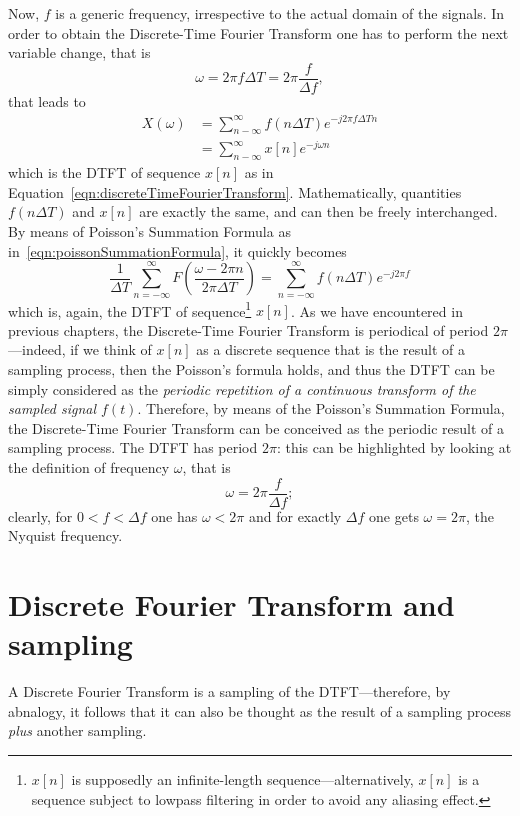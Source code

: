 \documentclass[\documentfontsize, twocolumn]{\classname}
\begin{document}
Now, $f$ is a generic frequency, irrespective to the actual domain of the signals. In order to obtain the Discrete-Time Fourier Transform one has to perform the next variable change, that is
\[
    \omega = 2\pi f \Delta T = 2 \pi \frac {f}{\Delta f},
\]
that leads to
\begin{align*}
    X(\omega) &= \sum_{n-\infty}^\infty f(n\Delta T) e^{-j2\pi f\Delta T n} \\
              &= \sum_{n-\infty}^\infty x[n] e^{-j\omega n}
\end{align*}
which is the DTFT of sequence $x[n]$ as in Equation~\ref{eqn:discreteTimeFourierTransform}. Mathematically, quantities $f(n\Delta T)$ and $x[n]$ are exactly the same, and can then be freely interchanged. By means of Poisson's Summation Formula as in~\ref{eqn:poissonSummationFormula}, it quickly becomes
\[
    \frac{1}{\Delta T} \sum_{n=-\infty}^\infty F\left(\frac {\omega - 2\pi n}{2\pi\Delta T}\right) = \sum_{n=-\infty}^\infty f(n\Delta T) e^{-j2\pi f}
\]
which is, again, the DTFT of sequence\footnote{$x[n]$ is supposedly an infinite-length sequence---alternatively, $x[n]$ is a sequence subject to lowpass filtering in order to avoid any aliasing effect.} $x[n]$. As we have encountered in previous chapters, the Discrete-Time Fourier Transform is periodical of period $2\pi$---indeed, if we think of $x[n]$ as a discrete sequence that is the result of a sampling process, then the Poisson's formula holds, and thus the DTFT can be simply considered as the \emph{periodic repetition of a continuous transform of the sampled signal $f(t)$}. Therefore, by means of the Poisson's Summation Formula, the Discrete-Time Fourier Transform can be conceived as the periodic result of a sampling process. The DTFT has period $2\pi$: this can be highlighted by looking at the definition of frequency $\omega$, that is
\[
    \omega = 2\pi \frac {f} {\Delta f};
\]
clearly, for $0 < f < \Delta f$ one has $\omega < 2\pi$ and for exactly $\Delta f$ one gets $\omega = 2\pi$, the Nyquist frequency.

\section{Discrete Fourier Transform and sampling}

A Discrete Fourier Transform is a sampling of the DTFT---therefore, by abnalogy, it follows that it can also be thought as the result of a sampling process \emph{plus} another sampling.
\end{document}
